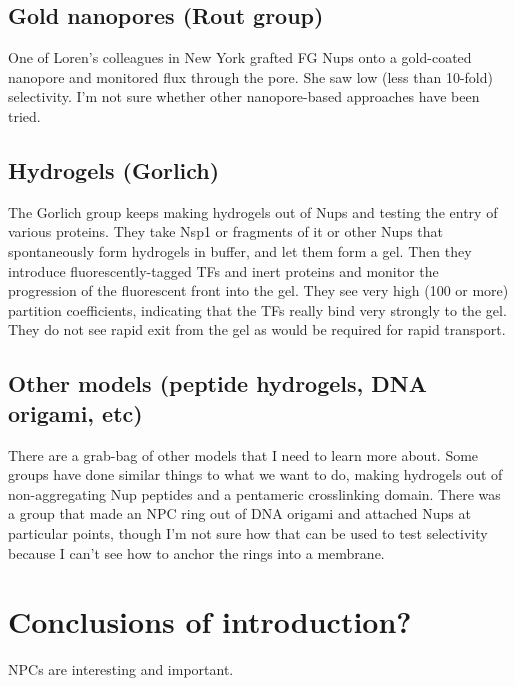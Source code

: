 \subsection{Gold nanopores (Rout group)}
One of Loren's colleagues in New York grafted FG Nups onto a gold-coated nanopore and monitored flux through the pore.  She saw low (less than 10-fold) selectivity.  I'm not sure whether other nanopore-based approaches have been tried.
\subsection{Hydrogels (Gorlich)}
The Gorlich group keeps making hydrogels out of Nups and testing the entry of various proteins.  They take Nsp1 or fragments of it or other Nups that spontaneously form hydrogels in buffer, and let them form a gel.  Then they introduce fluorescently-tagged TFs and inert proteins and monitor the progression of the fluorescent front into the gel.  They see very high (100 or more) partition coefficients, indicating that the TFs really bind very strongly to the gel.  They do not see rapid exit from the gel as would be required for rapid transport.
\subsection{Other models (peptide hydrogels, DNA origami, etc)}
There are a grab-bag of other models that I need to learn more about.  Some groups have done similar things to what we want to do, making hydrogels out of non-aggregating Nup peptides and a pentameric crosslinking domain.  There was a group that made an NPC ring out of DNA origami and attached Nups at particular points, though I'm not sure how that can be used to test selectivity because I can't see how to anchor the rings into a membrane.
\section{Conclusions of introduction?}
NPCs are interesting and important.


